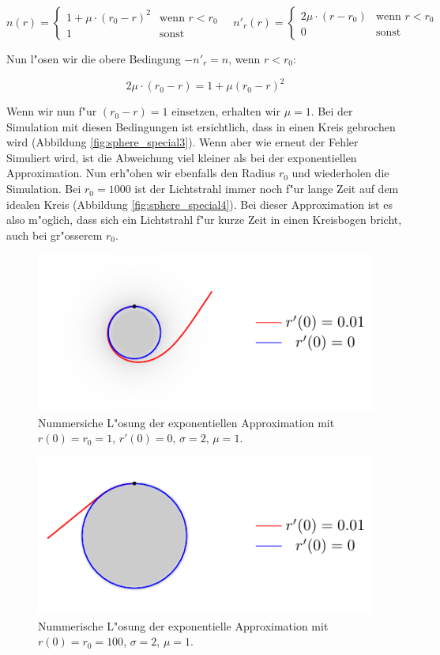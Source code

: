 \begin{refsection}
$$n(r) = \left\{ \begin{array}{ll} 1 + \mu \cdot (r_0 - r)^2 & \text{wenn } r < r_0 \\ 1 & \text{sonst} \end{array} \right. \quad n'_r(r) = \left\{ \begin{array}{ll} 2\mu \cdot (r - r_0) & \text{wenn } r < r_0 \\ 0 & \text{sonst} \end{array} \right.$$

Nun l"osen wir die obere Bedingung $-n'_r = n $, wenn $r < r_0$:

$$2\mu \cdot (r_0 - r) = 1 + \mu(r_0 - r)^2$$

Wenn wir nun f"ur $(r_0 - r) = 1$ einsetzen, erhalten wir $\mu = 1$. 
Bei der Simulation mit diesen Bedingungen ist ersichtlich, dass in einen Kreis gebrochen wird (Abbildung \ref{fig:sphere_special3}). 
Wenn aber wie erneut der Fehler Simuliert wird, ist die Abweichung viel kleiner als bei der exponentiellen Approximation. 
Nun erh"ohen wir ebenfalls den Radius $r_0$ und wiederholen die Simulation. 
Bei $r_0 = 1000$ ist der Lichtstrahl immer noch f"ur lange Zeit auf dem idealen Kreis (Abbildung \ref{fig:sphere_special4}). 
Bei dieser Approximation ist es also m"oglich, dass sich ein Lichtstrahl f"ur kurze Zeit in einen Kreisbogen bricht, auch bei gr"osserem $r_0$.

\begin{figure}
  \centering
  \includegraphics[scale=1]{licht/standalone/fig_kreis_exp1.pdf} 
  \caption{Nummersiche L"osung der exponentiellen Approximation mit $r(0) = r_0 = 1$, $r'(0) = 0$, $\sigma = 2$, $\mu = 1$. \label{fig:sphere_special1}}

\end{figure}

\begin{figure}
  \centering
  \includegraphics[scale=1]{licht/standalone/fig_kreis_exp2.pdf}
  \caption{Nummerische L"osung der exponentielle Approximation mit $r(0) = r_0 = 100$, $\sigma = 2$, $\mu = 1$. \label{fig:sphere_special2}} 
  

\end{figure}
\end{refsection}

